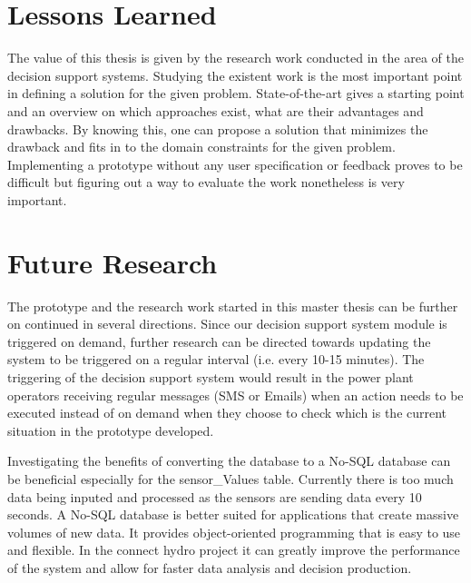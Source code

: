 \section{Lessons Learned}
\label{sec:LessonsLearned}
The value of this thesis is given by the research work conducted in the area of the decision support systems. Studying the existent work is the most important point in defining a solution for the given problem. State-of-the-art gives a starting point and an overview on which approaches exist, what are their advantages and drawbacks. By knowing this, one can propose a solution that minimizes the drawback and fits in to the domain constraints for the given problem. Implementing a prototype without any user specification or feedback proves to be difficult but figuring out a way to evaluate the work nonetheless is very important.
\section{Future Research}
\label{sec:FutureResearch}
The prototype and the research work started in this master thesis can be further on continued in several directions. Since our decision support system module is triggered on demand, further research can be directed towards updating the system to be triggered on a regular interval (i.e. every 10-15 minutes). The triggering of the decision support system would result in the power plant operators receiving regular messages (SMS or Emails) when an action needs to be executed instead of on demand when they choose to check which is the current situation in the prototype developed. 

Investigating the benefits of converting the database to a No-SQL database can be beneficial especially for the sensor\_Values table. Currently there is too much data being inputed and processed as the sensors are sending data every 10 seconds. A No-SQL database is better suited for applications that create massive volumes of new data. It provides object-oriented programming that is easy to use and flexible. In the connect hydro project it can greatly improve the performance of the system and allow for faster data analysis and decision production.

